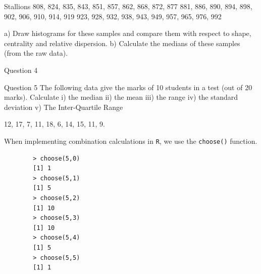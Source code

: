 \documentclass[12pt]{report}
\begin{document}
Stallions
808, 824, 835, 843, 851, 857, 862, 868, 872, 877
881, 886, 890, 894, 898, 902, 906, 910, 914, 919
923, 928, 932, 938, 943, 949, 957, 965, 976, 992


a)	Draw histograms for these samples and compare them with respect to shape, centrality and relative dispersion. 
b)	Calculate the medians of these samples (from the raw data).




Question 4

 

Question 5
The following data give the marks of 10 students in a test (out of 20 marks). Calculate
i) the median    ii) the mean     iii) the range    iv) the standard deviation v) The Inter-Quartile Range

12, 17, 7, 11, 18, 6, 14, 15, 11, 9.


		When implementing combination calculations in \texttt{R}, we use the \texttt{choose()} function.
		
		\begin{verbatim}
		> choose(5,0)
		[1] 1
		> choose(5,1)
		[1] 5
		> choose(5,2)
		[1] 10
		> choose(5,3)
		[1] 10
		> choose(5,4)
		[1] 5
		> choose(5,5)
		[1] 1
		\end{verbatim}
		
\end{document}
